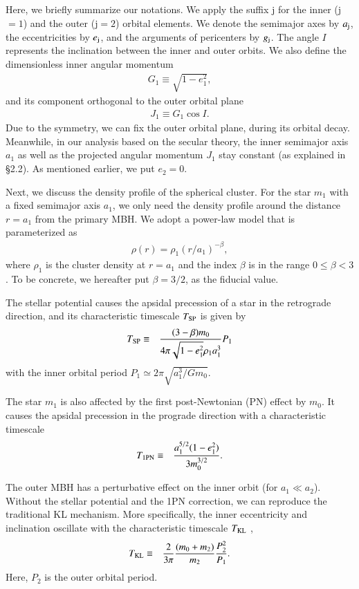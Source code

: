 \documentclass[useAMS,usenatbib,twocolumn]{mn2e}
\newcommand{\beqa}{\begin{eqnarray}}
\newcommand{\eeqa}{\end{eqnarray}}
\begin{document}
Here, we briefly summarize our notations. We apply the suffix j
for the inner (j$=1$) and the outer (j$=2$) orbital elements. We denote
the semimajor axes by $a_{\rm j}$, the eccentricities by
$e_{\rm j}$, and the arguments of pericenters by $g_{\rm j}$.
The angle $I$ represents the inclination between the inner and
outer orbits.
We also define the dimensionless inner angular momentum  
\beqa
G_1\equiv\sqrt{1-e_{1}^{2}},
\eeqa
and its component orthogonal to the outer orbital plane 
\beqa
J_1\equiv G_1\cos I.
\eeqa
Due to the symmetry, we can fix the outer orbital plane, during its orbital decay. 
Meanwhile, in our
analysis based on the secular theory, the inner semimajor axis
$a_1$ as well as the projected angular momentum $J_1$ stay constant (as explained in \S 2.2).
As mentioned earlier, we put $e_2=0$.
 
Next, we discuss the density profile of the spherical 
cluster.
For the star $m_1$ with a fixed semimajor axis $a_1$,
we only need the density profile around the distance $r=a_1$ from 
the primary MBH.
We adopt  a power-law model that is parameterized as 
\beqa
\rho(r)=\rho_1 (r/a_1)^{-\beta},
\eeqa
where $\rho_1$ is the cluster density at $r=a_1$ and the index
$\beta$ is in the range $0\le \beta< 3$ \citep{merritt2013}. To be concrete, we
hereafter put $\beta=3/2$, as the fiducial value.



The stellar potential causes the apsidal precession of a star in
the retrograde direction, and its characteristic timescale
$T_{\rm SP}$ \citep{merritt2013} is given by
\beqa
T_{\rm SP}&\equiv& \frac{(3-\beta)m_0}{4\pi
\sqrt{1-e_{1}^{2}}\rho_1 a_{1}^{3}}P_1\label{eq:sp}
\eeqa
with the inner orbital period $P_1\simeq 2\pi \sqrt{a_1^3/Gm_0}$.

The star $m_1$ is also affected by the first post-Newtonian (PN) effect by $m_0$. 
It causes the apsidal precession in the prograde direction \citep{holman1997,ford2000,merritt2013}
with a characteristic timescale 
\beqa
T_{\rm1PN}&\equiv&
\frac{a_{1}^{5/2}(1-e_{1}^{2})}{3m_{0}^{3/2}}.
\eeqa

The outer MBH has a perturbative effect on the inner orbit (for
$a_1\ll a_2$). Without the stellar potential and the 1PN
correction, we can reproduce the traditional KL mechanism. More
specifically, the inner eccentricity and inclination oscillate
with the characteristic timescale $T_{\rm KL}$
\citep{holman1997,kinoshita1999,ford2000,fabrycky2007,antognini2015},
\beqa
T_{\rm
KL}&\equiv&\frac{2}{3\pi}\frac{(m_{0}+m_{2})}{m_2}\frac{P_{2}^{2}}{P_{1}}.
\eeqa
Here, $P_2$ is the outer orbital period.
\end{document}
